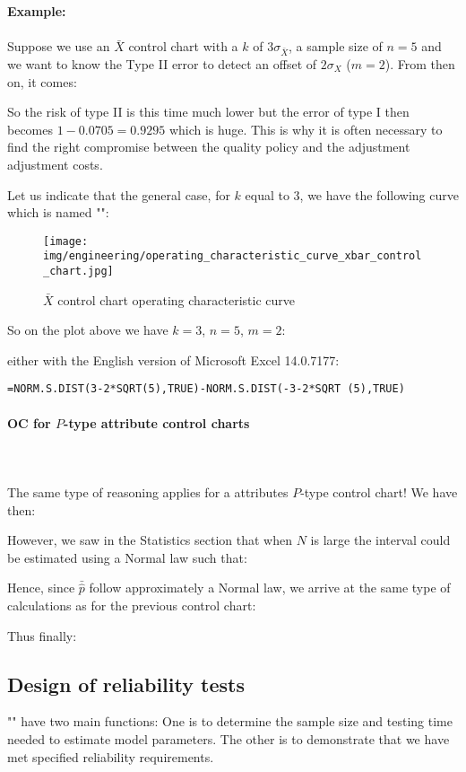  	\begin{tcolorbox}[colframe=black,colback=white,sharp corners]
	\textbf{{\Large {}}Example:}\\\\
	Suppose we use an $\bar{X}$ control chart with a $k$ of $3\sigma_{\bar{X}}$, a sample size of $n=5$ and we want to know the Type II error to detect an offset of $2\sigma_X$ ($m=2$). From then on, it comes:
	
	So the risk of type II is this time much lower but the error of type I then becomes $1-0.0705 = 0.9295$ which is huge. This is why it is often necessary to find the right compromise between the quality policy and the adjustment adjustment costs.
	\end{tcolorbox}
	Let us indicate that the general case, for $k$ equal to $3$, we have the following curve which is named "":
	 \begin{figure}[H]
		\centering
		\texttt{[image: img/engineering/operating\_characteristic\_curve\_xbar\_control\_chart.jpg]}
		\caption{$\bar{X}$ control chart operating characteristic curve}
	\end{figure}
	So on the plot above we have $k=3$, $n=5$, $m=2$:
	
 	either with the English version of Microsoft Excel 14.0.7177:
	\begin{center}
		\texttt{=NORM.S.DIST(3-2*SQRT(5),TRUE)-NORM.S.DIST(-3-2*SQRT (5),TRUE)}
	\end{center}
	
	\paragraph{OC for $P$-type attribute control charts}\mbox{}\\\\
	The same type of reasoning applies for a attributes $P$-type control chart! We have then:
	
	However, we saw in the Statistics section that when $N$ is large the interval could be estimated using a Normal law such that:
	
 	Hence, since $\bar{\hat{p}}$ follow approximately a Normal law, we arrive at the same type of calculations as for the previous control chart:
	
	Thus finally:
	
	
	 \pagebreak
	 \subsection{Design of reliability tests}\label{design of reliability tests}
	 "" have two main functions: One is to determine the sample size and testing time needed to estimate model parameters. The other is to demonstrate that we have met specified reliability requirements.


